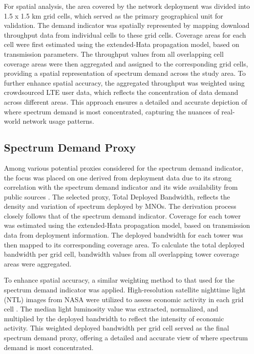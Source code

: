 \documentclass[conference]{IEEEtran}
\begin{document}
For spatial analysis, the area covered by the network deployment was divided into 1.5 x 1.5 km grid cells, which served as the primary geographical unit for validation. The demand indicator was spatially represented by mapping download throughput data from individual cells to these grid cells. Coverage areas for each cell were first estimated using the extended-Hata propagation model, based on transmission parameters. The throughput values from all overlapping cell coverage areas were then aggregated and assigned to the corresponding grid cells, providing a spatial representation of spectrum demand across the study area. To further enhance spatial accuracy, the aggregated throughput was weighted using crowdsourced LTE user data, which reflects the concentration of data demand across different areas. This approach ensures a detailed and accurate depiction of where spectrum demand is most concentrated, capturing the nuances of real-world network usage patterns.

\subsection{Spectrum Demand Proxy}
Among various potential proxies considered for the spectrum demand indicator, the focus was placed on one derived from deployment data due to its strong correlation with the spectrum demand indicator and its wide availability from public sources \cite{ISED_spectrum_data}. The selected proxy, Total Deployed Bandwidth, reflects the density and variation of spectrum deployed by MNOs. The derivation process closely follows that of the spectrum demand indicator. Coverage for each tower was estimated using the extended-Hata propagation model, based on transmission data from deployment information. The deployed bandwidth for each tower was then mapped to its corresponding coverage area. To calculate the total deployed bandwidth per grid cell, bandwidth values from all overlapping tower coverage areas were aggregated.

To enhance spatial accuracy, a similar weighting method to that used for the spectrum demand indicator was applied. High-resolution satellite nighttime light (NTL) images from NASA were utilized to assess economic activity in each grid cell \cite{eog_viirs_nightlights}. The median light luminosity value was extracted, normalized, and multiplied by the deployed bandwidth to reflect the intensity of economic activity. This weighted deployed bandwidth per grid cell served as the final spectrum demand proxy, offering a detailed and accurate view of where spectrum demand is most concentrated.
\end{document}
